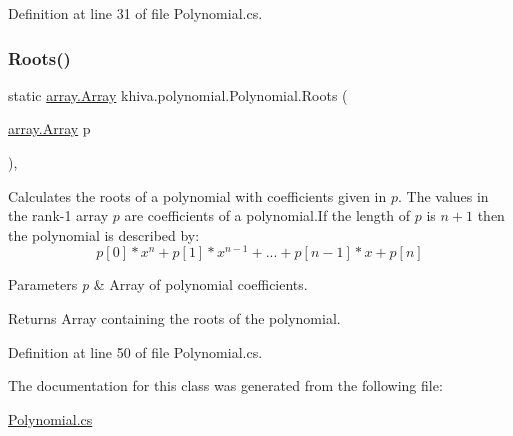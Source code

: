 Definition at line 31 of file Polynomial.\+cs.

\mbox{\label{classkhiva_1_1polynomial_1_1_polynomial_a557baa3b31ba666176f9ed67b6a06abb}} 
\subsubsection{\texorpdfstring{Roots()}{Roots()}}
{\footnotesize\ttfamily static \mbox{\hyperlink{classkhiva_1_1array_1_1_array}{array.\+Array}} khiva.\+polynomial.\+Polynomial.\+Roots (\begin{DoxyParamCaption}\item[{\mbox{\hyperlink{classkhiva_1_1array_1_1_array}{array.\+Array}}}]{p }\end{DoxyParamCaption})\hspace{0.3cm}{\ttfamily [inline]}, {\ttfamily [static]}}



Calculates the roots of a polynomial with coefficients given in $p$. The values in the rank-\/1 array $p$ are coefficients of a polynomial.\+If the length of $p$ is $n+1$ then the polynomial is described by\+: \[ p[0] * x ^ n + p[1] * x ^{n-1} + ... + p[n - 1] * x + p[n] \] 


\begin{DoxyParams}{Parameters}
{\em p} & Array of polynomial coefficients.\\
\hline
\end{DoxyParams}
\begin{DoxyReturn}{Returns}
Array containing the roots of the polynomial.
\end{DoxyReturn}


Definition at line 50 of file Polynomial.\+cs.



The documentation for this class was generated from the following file\+:\begin{DoxyCompactItemize}
\item 
\mbox{\hyperlink{_polynomial_8cs}{Polynomial.\+cs}}\end{DoxyCompactItemize}
